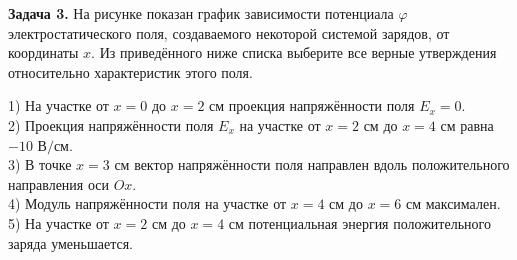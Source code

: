 \begin{taskbasic}[code={\label{task:elem_pot_v5_n15}}]
\textbf{Задача 3.} На рисунке показан график зависимости потенциала $\varphi$ электростатического поля, создаваемого некоторой системой зарядов, от координаты $x$. Из приведённого ниже списка выберите все верные утверждения относительно характеристик этого поля.

\nopagebreak\smallskip
\begin{center}
\end{center}

1) На участке от $x = 0$ до $x = 2\text{ см}$ проекция напряжённости поля $E_x = 0$.\\
2) Проекция напряжённости поля $E_x$ на участке от $x = 2\text{ см}$ до $x = 4\text{ см}$ равна $-10\text{ В/см}$.\\
3) В точке $x = 3\text{ см}$ вектор напряжённости поля направлен вдоль положительного направления оси $Ox$.\\
4) Модуль напряжённости поля на участке от $x = 4\text{ см}$ до $x = 6\text{ см}$ максимален.\\
5) На участке от $x = 2\text{ см}$ до $x = 4\text{ см}$ потенциальная энергия положительного заряда уменьшается.

\end{taskbasic}

